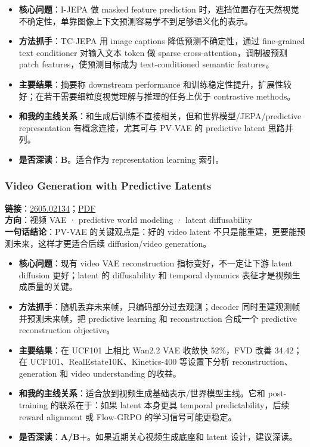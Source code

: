 \begin{itemize}[leftmargin=1.5em]
  \item \textbf{核心问题}：I-JEPA 做 masked feature prediction 时，遮挡位置存在天然视觉不确定性，单靠图像上下文预测容易学不到足够语义化的表示。
  \item \textbf{方法抓手}：TC-JEPA 用 image captions 降低预测不确定性，通过 fine-grained text conditioner 对输入文本 token 做 sparse cross-attention，调制被预测 patch features，使预测目标成为 text-conditioned semantic features。
  \item \textbf{主要结果}：摘要称 downstream performance 和训练稳定性提升，扩展性较好；在若干需要细粒度视觉理解与推理的任务上优于 contrastive methods。
  \item \textbf{和我的主线关系}：和生成后训练不直接相关，但和世界模型/JEPA/predictive representation 有概念连接，尤其可与 PV-VAE 的 predictive latent 思路并列。
  \item \textbf{是否深读}：\textbf{B}。适合作为 representation learning 索引。
\end{itemize}

\subsubsection{Video Generation with Predictive Latents}

\textbf{链接}：\href{https://arxiv.org/abs/2605.02134}{2605.02134}；\href{https://arxiv.org/pdf/2605.02134}{PDF}\\
\textbf{方向}：视频 VAE · predictive world modeling · latent diffusability\\
\textbf{一句话结论}：PV-VAE 的关键观点是：好的 video latent 不只是能重建，更要能预测未来，这样才更适合后续 diffusion/video generation。

\begin{itemize}[leftmargin=1.5em]
  \item \textbf{核心问题}：现有 video VAE reconstruction 指标变好，不一定让下游 latent diffusion 更好；latent 的 diffusability 和 temporal dynamics 表征才是视频生成质量的关键。
  \item \textbf{方法抓手}：随机丢弃未来帧，只编码部分过去观测；decoder 同时重建观测帧并预测未来帧，把 predictive learning 和 reconstruction 合成一个 predictive reconstruction objective。
  \item \textbf{主要结果}：在 UCF101 上相比 Wan2.2 VAE 收敛快 52\%，FVD 改善 34.42；在 UCF101、RealEstate10K、Kinetics-400 等设置下分析 reconstruction、generation 和 video understanding 的收益。
  \item \textbf{和我的主线关系}：适合放到视频生成基础表示/世界模型主线。它和 post-training 的联系在于：如果 latent 本身更具 temporal predictability，后续 reward alignment 或 Flow-GRPO 的学习信号可能更稳定。
  \item \textbf{是否深读}：\textbf{A/B+}。如果近期关心视频生成底座和 latent 设计，建议深读。
\end{itemize}

